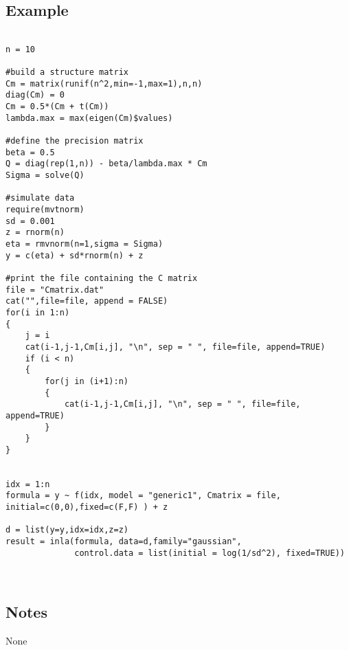 \documentclass[a4paper,11pt]{article}
\begin{document}
\subsection*{Example}
\begin{verbatim}

n = 10

#build a structure matrix
Cm = matrix(runif(n^2,min=-1,max=1),n,n)
diag(Cm) = 0
Cm = 0.5*(Cm + t(Cm))
lambda.max = max(eigen(Cm)$values)

#define the precision matrix
beta = 0.5
Q = diag(rep(1,n)) - beta/lambda.max * Cm
Sigma = solve(Q)

#simulate data
require(mvtnorm)
sd = 0.001
z = rnorm(n)
eta = rmvnorm(n=1,sigma = Sigma)
y = c(eta) + sd*rnorm(n) + z

#print the file containing the C matrix
file = "Cmatrix.dat"
cat("",file=file, append = FALSE)
for(i in 1:n)
{
    j = i
    cat(i-1,j-1,Cm[i,j], "\n", sep = " ", file=file, append=TRUE)
    if (i < n)
    {
        for(j in (i+1):n)
        {
            cat(i-1,j-1,Cm[i,j], "\n", sep = " ", file=file, append=TRUE)
        }
    }
}


idx = 1:n
formula = y ~ f(idx, model = "generic1", Cmatrix = file, initial=c(0,0),fixed=c(F,F) ) + z

d = list(y=y,idx=idx,z=z)
result = inla(formula, data=d,family="gaussian",
              control.data = list(initial = log(1/sd^2), fixed=TRUE))



\end{verbatim}

\subsection*{Notes}
None
\end{document}
